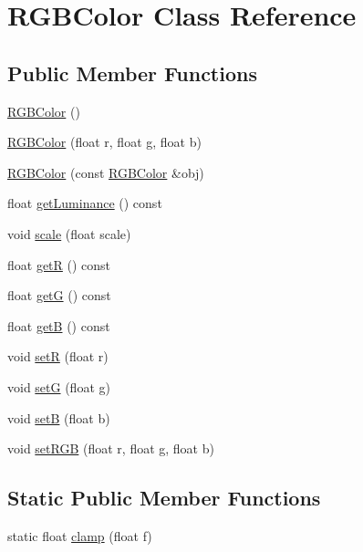 \hypertarget{classRGBColor}{}\section{R\+G\+B\+Color Class Reference}
\label{classRGBColor}
\subsection*{Public Member Functions}
\begin{DoxyCompactItemize}
\item 
\hyperlink{classRGBColor_a9383ce7b63b0a6ada5d4e54e16adf733}{R\+G\+B\+Color} ()
\item 
\hyperlink{classRGBColor_af44214dbf9bde6a25966befae33e12d9}{R\+G\+B\+Color} (float r, float g, float b)
\item 
\hyperlink{classRGBColor_aa840e4da290c1b2d8df0b37ad4a749ea}{R\+G\+B\+Color} (const \hyperlink{classRGBColor}{R\+G\+B\+Color} \&obj)
\item 
float \hyperlink{classRGBColor_ab521d09d138ac4dc61adcc45a025a138}{get\+Luminance} () const
\item 
void \hyperlink{classRGBColor_a9008f6aaf9a9374eeaaa8b73c4fc84ee}{scale} (float scale)
\item 
float \hyperlink{classRGBColor_a560c099c82f20f847208aa05091512ff}{getR} () const
\item 
float \hyperlink{classRGBColor_ada2cef91231face94996d7ebe53453ed}{getG} () const
\item 
float \hyperlink{classRGBColor_a4217b27c5c614db123cfb1b66f8db051}{getB} () const
\item 
void \hyperlink{classRGBColor_a0aa527101511bf66f0bc2a4488a466e8}{setR} (float r)
\item 
void \hyperlink{classRGBColor_a56d7898021c2266d21c583c41da1fd98}{setG} (float g)
\item 
void \hyperlink{classRGBColor_a9e42be9f3ed553d786a02b0096763e89}{setB} (float b)
\item 
void \hyperlink{classRGBColor_acfa405c3453c2224c5420b021ec1f1c6}{set\+R\+GB} (float r, float g, float b)
\end{DoxyCompactItemize}
\subsection*{Static Public Member Functions}
\begin{DoxyCompactItemize}
\item 
static float \hyperlink{classRGBColor_ae030153b72ea8d8dc465ebbcbfb7a28e}{clamp} (float f)
\end{DoxyCompactItemize}


